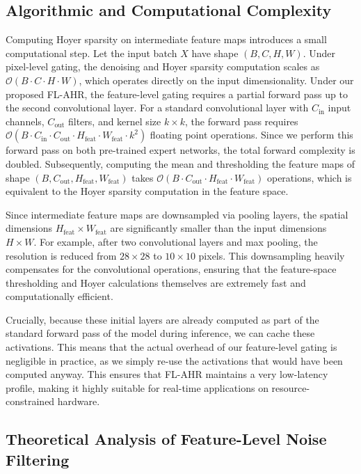 \documentclass{article}
\theoremstyle{plain}
\theoremstyle{definition}
\theoremstyle{remark}
\begin{document}
\subsection{Algorithmic and Computational Complexity}
Computing Hoyer sparsity on intermediate feature maps introduces a small computational step. Let the input batch $X$ have shape $(B, C, H, W)$. 
Under pixel-level gating, the denoising and Hoyer sparsity computation scales as $\mathcal{O}(B \cdot C \cdot H \cdot W)$, which operates directly on the input dimensionality.
Under our proposed FL-AHR, the feature-level gating requires a partial forward pass up to the second convolutional layer. 
For a standard convolutional layer with $C_{\text{in}}$ input channels, $C_{\text{out}}$ filters, and kernel size $k \times k$, the forward pass requires $\mathcal{O}(B \cdot C_{\text{in}} \cdot C_{\text{out}} \cdot H_{\text{feat}} \cdot W_{\text{feat}} \cdot k^2)$ floating point operations. Since we perform this forward pass on both pre-trained expert networks, the total forward complexity is doubled.
Subsequently, computing the mean and thresholding the feature maps of shape $(B, C_{\text{out}}, H_{\text{feat}}, W_{\text{feat}})$ takes $\mathcal{O}(B \cdot C_{\text{out}} \cdot H_{\text{feat}} \cdot W_{\text{feat}})$ operations, which is equivalent to the Hoyer sparsity computation in the feature space.

Since intermediate feature maps are downsampled via pooling layers, the spatial dimensions $H_{\text{feat}} \times W_{\text{feat}}$ are significantly smaller than the input dimensions $H \times W$. For example, after two convolutional layers and max pooling, the resolution is reduced from $28 \times 28$ to $10 \times 10$ pixels. This downsampling heavily compensates for the convolutional operations, ensuring that the feature-space thresholding and Hoyer calculations themselves are extremely fast and computationally efficient. 

Crucially, because these initial layers are already computed as part of the standard forward pass of the model during inference, we can cache these activations. This means that the actual overhead of our feature-level gating is negligible in practice, as we simply re-use the activations that would have been computed anyway. This ensures that FL-AHR maintains a very low-latency profile, making it highly suitable for real-time applications on resource-constrained hardware.

\subsection{Theoretical Analysis of Feature-Level Noise Filtering}
\end{document}
